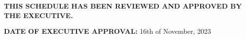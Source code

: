\textbf{THIS SCHEDULE HAS BEEN REVIEWED AND APPROVED BY THE EXECUTIVE.}

\vspace{0.5cm}
\textbf{DATE OF EXECUTIVE APPROVAL:} 16th of November, 2023
